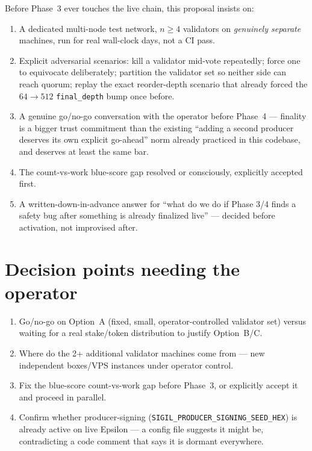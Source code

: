 \documentclass[10pt,a4paper]{article}
\begin{document}
Before Phase~3 ever touches the live chain, this proposal insists on:
\begin{enumerate}[leftmargin=1.4em]
  \item A dedicated multi-node test network, $n{\geq}4$ validators on \emph{genuinely separate}
  machines, run for real wall-clock days, not a CI pass.
  \item Explicit adversarial scenarios: kill a validator mid-vote repeatedly; force one to equivocate
  deliberately; partition the validator set so neither side can reach quorum; replay the exact
  reorder-depth scenario that already forced the $64{\to}512$ \texttt{final\_depth} bump once before.
  \item A genuine go/no-go conversation with the operator before Phase~4 — finality is a bigger trust
  commitment than the existing ``adding a second producer deserves its own explicit go-ahead'' norm
  already practiced in this codebase, and deserves at least the same bar.
  \item The count-vs-work blue-score gap resolved or consciously, explicitly accepted first.
  \item A written-down-in-advance answer for ``what do we do if Phase 3/4 finds a safety bug after
  something is already finalized live'' — decided before activation, not improvised after.
\end{enumerate}

\section*{Decision points needing the operator}

\begin{enumerate}[leftmargin=1.4em]
  \item Go/no-go on Option~A (fixed, small, operator-controlled validator set) versus waiting for a real
  stake/token distribution to justify Option~B/C.
  \item Where do the 2+ additional validator machines come from — new independent boxes/VPS instances
  under operator control.
  \item Fix the blue-score count-vs-work gap before Phase~3, or explicitly accept it and proceed in
  parallel.
  \item Confirm whether producer-signing (\texttt{SIGIL\_PRODUCER\_SIGNING\_SEED\_HEX}) is already
  active on live Epsilon — a config file suggests it might be, contradicting a code comment that says
  it is dormant everywhere.
\end{enumerate}
\end{document}
